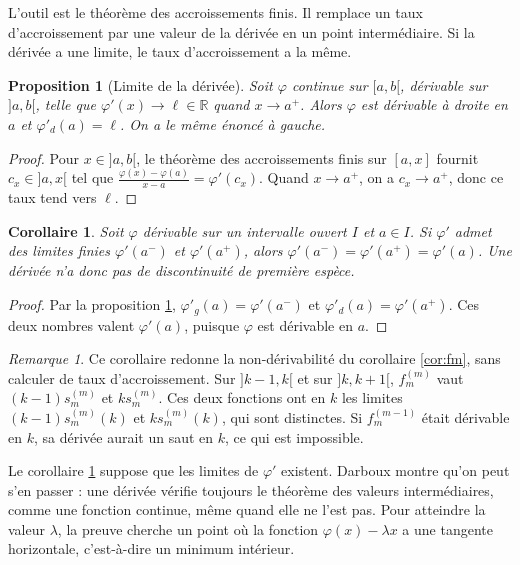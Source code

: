 \documentclass[11pt,a4paper]{article}
\theoremstyle{plain}
\newtheorem{proposition}[theoreme]{Proposition}
\newtheorem{corollaire}[theoreme]{Corollaire}
\theoremstyle{definition}
\theoremstyle{remark}
\newtheorem{remarque}[theoreme]{Remarque}
\newcommand{\R}{\mathbb{R}}
\newcommand{\1}{\mathbf{1}}
\begin{document}
L'outil est le théorème des accroissements finis. Il remplace un taux d'accroissement par une valeur de la dérivée en un point intermédiaire. Si la dérivée a une limite, le taux d'accroissement a la même.

\begin{proposition}[Limite de la dérivée]\label{prop:limite-derivee}
Soit $\varphi$ continue sur $[a,b[$, dérivable sur $]a,b[$, telle que $\varphi'(x)\to\ell\in\R$ quand $x\to a^+$. Alors $\varphi$ est dérivable à droite en $a$ et $\varphi'_d(a)=\ell$. On a le même énoncé à gauche.
\end{proposition}

\begin{proof}
Pour $x\in]a,b[$, le théorème des accroissements finis sur $[a,x]$ fournit $c_x\in]a,x[$ tel que $\frac{\varphi(x)-\varphi(a)}{x-a}=\varphi'(c_x)$. Quand $x\to a^+$, on a $c_x\to a^+$, donc ce taux tend vers $\ell$.
\end{proof}

\begin{corollaire}\label{cor:pas-de-saut}
Soit $\varphi$ dérivable sur un intervalle ouvert $I$ et $a\in I$. Si $\varphi'$ admet des limites finies $\varphi'(a^-)$ et $\varphi'(a^+)$, alors $\varphi'(a^-)=\varphi'(a^+)=\varphi'(a)$. Une dérivée n'a donc pas de discontinuité de première espèce.
\end{corollaire}

\begin{proof}
Par la proposition \ref{prop:limite-derivee}, $\varphi'_g(a)=\varphi'(a^-)$ et $\varphi'_d(a)=\varphi'(a^+)$. Ces deux nombres valent $\varphi'(a)$, puisque $\varphi$ est dérivable en $a$.
\end{proof}

\begin{remarque}
Ce corollaire redonne la non-dérivabilité du corollaire \ref{cor:fm}, sans calculer de taux d'accroissement. Sur $]k-1,k[$ et sur $]k,k+1[$, $f_m^{(m)}$ vaut $(k-1)s_m^{(m)}$ et $ks_m^{(m)}$. Ces deux fonctions ont en $k$ les limites $(k-1)s_m^{(m)}(k)$ et $ks_m^{(m)}(k)$, qui sont distinctes. Si $f_m^{(m-1)}$ était dérivable en $k$, sa dérivée aurait un saut en $k$, ce qui est impossible.
\end{remarque}

Le corollaire \ref{cor:pas-de-saut} suppose que les limites de $\varphi'$ existent. Darboux montre qu'on peut s'en passer : une dérivée vérifie toujours le théorème des valeurs intermédiaires, comme une fonction continue, même quand elle ne l'est pas. Pour atteindre la valeur $\lambda$, la preuve cherche un point où la fonction $\varphi(x)-\lambda x$ a une tangente horizontale, c'est-à-dire un minimum intérieur.
\end{document}
